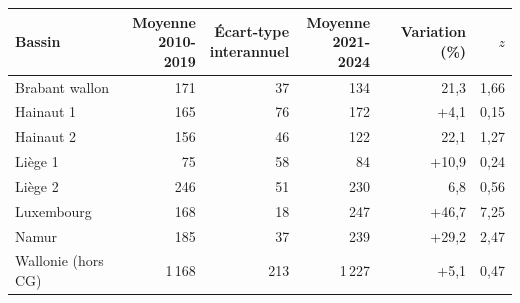 \begin{tabular}{lrrrrr}
\toprule
Bassin & \makecell{Moyenne\\2010-2019} & \makecell{Écart-type\\interannuel} & \makecell{Moyenne\\2021-2024} & Variation (\%) & $z$ \\
\midrule
Brabant wallon & 171 & 37 & 134 & \textminus{}21{,}3 & \textminus{}1{,}66 \\
Hainaut 1 & 165 & 76 & 172 & +4{,}1 & 0{,}15 \\
Hainaut 2 & 156 & 46 & 122 & \textminus{}22{,}1 & \textminus{}1{,}27 \\
Liège 1 & 75 & 58 & 84 & +10{,}9 & 0{,}24 \\
Liège 2 & 246 & 51 & 230 & \textminus{}6{,}8 & \textminus{}0{,}56 \\
Luxembourg & 168 & 18 & 247 & +46{,}7 & 7{,}25 \\
Namur & 185 & 37 & 239 & +29{,}2 & 2{,}47 \\
Wallonie (hors CG) & 1\,168 & 213 & 1\,227 & +5{,}1 & 0{,}47 \\
\bottomrule
\end{tabular}

